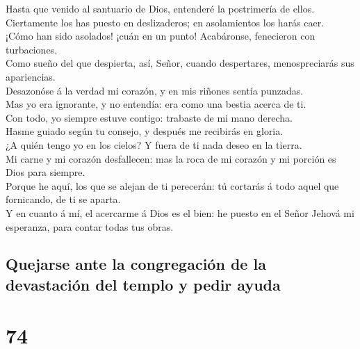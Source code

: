  Hasta que venido al santuario de Dios, entenderé la
postrimería de ellos.\\
 Ciertamente los has puesto en deslizaderos; en
asolamientos los harás caer.\\
 ¡Cómo han sido asolados! ¡cuán en un punto! Acabáronse,
fenecieron con turbaciones.\\
 Como sueño del que despierta, así, Señor, cuando
despertares, menospreciarás sus apariencias.\\
 Desazonóse á la verdad mi corazón, y en mis riñones
sentía punzadas.\\
 Mas yo era ignorante, y no entendía: era como una bestia
acerca de ti.\\
 Con todo, yo siempre estuve contigo: trabaste de mi mano
derecha.\\
 Hasme guiado según tu consejo, y después me recibirás en
gloria.\\
 ¿A quién tengo yo en los cielos? Y fuera de ti nada
deseo en la tierra.\\
 Mi carne y mi corazón desfallecen: mas la roca de mi
corazón y mi porción es Dios para siempre.\\
 Porque he aquí, los que se alejan de ti perecerán: tú
cortarás á todo aquel que fornicando, de ti se aparta.\\
 Y en cuanto á mí, el acercarme á Dios es el bien: he
puesto en el Señor Jehová mi esperanza, para contar todas tus obras.

\hypertarget{quejarse-ante-la-congregaciuxf3n-de-la-devastaciuxf3n-del-templo-y-pedir-ayuda}{%
\subsection{Quejarse ante la congregación de la devastación del templo y
pedir
ayuda}\label{quejarse-ante-la-congregaciuxf3n-de-la-devastaciuxf3n-del-templo-y-pedir-ayuda}}

\hypertarget{section-73}{%
\section{74}\label{section-73}}

